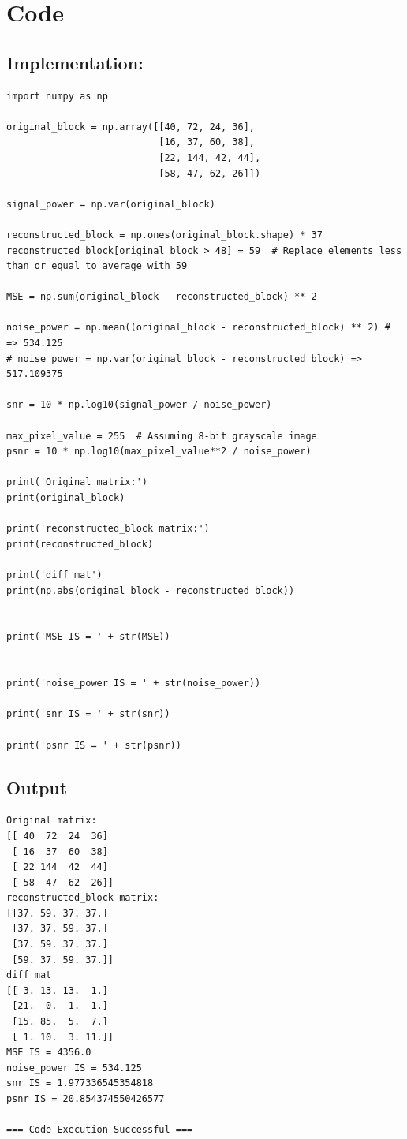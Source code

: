 \documentclass[letterpaper, 12pt]{article}
\begin{document}
\newpage
\section{Code}
\subsection*{Implementation:}
\begin{lstlisting}
import numpy as np

original_block = np.array([[40, 72, 24, 36],
                           [16, 37, 60, 38],
                           [22, 144, 42, 44],
                           [58, 47, 62, 26]])

signal_power = np.var(original_block)

reconstructed_block = np.ones(original_block.shape) * 37
reconstructed_block[original_block > 48] = 59  # Replace elements less than or equal to average with 59

MSE = np.sum(original_block - reconstructed_block) ** 2

noise_power = np.mean((original_block - reconstructed_block) ** 2) # => 534.125
# noise_power = np.var(original_block - reconstructed_block) => 517.109375

snr = 10 * np.log10(signal_power / noise_power)

max_pixel_value = 255  # Assuming 8-bit grayscale image
psnr = 10 * np.log10(max_pixel_value**2 / noise_power)

print('Original matrix:')
print(original_block)

print('reconstructed_block matrix:')
print(reconstructed_block)

print('diff mat')
print(np.abs(original_block - reconstructed_block))


print('MSE IS = ' + str(MSE))


print('noise_power IS = ' + str(noise_power))

print('snr IS = ' + str(snr))

print('psnr IS = ' + str(psnr))
\end{lstlisting}


\subsection*{Output}

\begin{lstlisting}
Original matrix:
[[ 40  72  24  36]
 [ 16  37  60  38]
 [ 22 144  42  44]
 [ 58  47  62  26]]
reconstructed_block matrix:
[[37. 59. 37. 37.]
 [37. 37. 59. 37.]
 [37. 59. 37. 37.]
 [59. 37. 59. 37.]]
diff mat
[[ 3. 13. 13.  1.]
 [21.  0.  1.  1.]
 [15. 85.  5.  7.]
 [ 1. 10.  3. 11.]]
MSE IS = 4356.0
noise_power IS = 534.125
snr IS = 1.977336545354818
psnr IS = 20.854374550426577

=== Code Execution Successful ===
\end{lstlisting}
\end{document}

